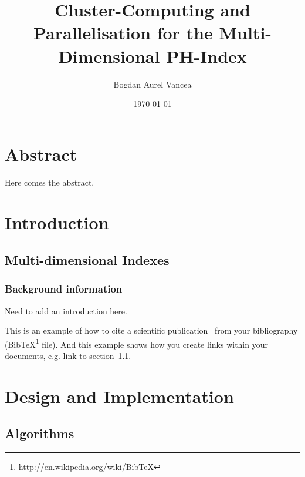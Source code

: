 \documentclass[11pt,a4paper]{globis-book}
\title{Cluster-Computing and Parallelisation for the
    Multi-Dimensional PH-Index}
\author{Bogdan Aurel Vancea}
\institute{Institute of Information Systems}
\date{\today}
\begin{document}
\frontmatter
\maketitlepage
\cleardoublepage
{}

\chapter*{Abstract}

Here comes the abstract.

\tableofcontents

\mainmatter


\chapter{Introduction}
\section{Multi-dimensional Indexes}
\label{sec:title}

\subsection{Background information}
Need to add an introduction here.

This is an example of how to cite a scientific publication~\cite{murolo2013} from your bibliography (BibTeX\footnote{\url{http://en.wikipedia.org/wiki/BibTeX}} file). And this example shows how you create links within your documents, e.g. link to section~\ref{sec:title}.

\chapter{Design and Implementation}
\section{Algorithms}
\end{document}
